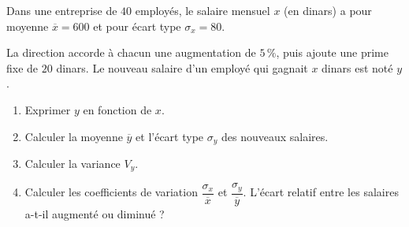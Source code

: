 
Dans une entreprise de $40$ employés, le salaire mensuel $x$ (en dinars) a pour moyenne $\overline{x}=600$ et pour écart type $\sigma_x=80$.

La direction accorde à chacun une augmentation de $5\,\%$, puis ajoute une prime fixe de $20$ dinars. Le nouveau salaire d'un employé qui gagnait $x$ dinars est noté $y$.

\begin{enumerate}
  \item Exprimer $y$ en fonction de $x$.
  \item Calculer la moyenne $\overline{y}$ et l'écart type $\sigma_y$ des nouveaux salaires.
  \item Calculer la variance $V_y$.
  \item Calculer les coefficients de variation $\dfrac{\sigma_x}{\overline{x}}$ et $\dfrac{\sigma_y}{\overline{y}}$. L'écart relatif entre les salaires a-t-il augmenté ou diminué ?
\end{enumerate}

